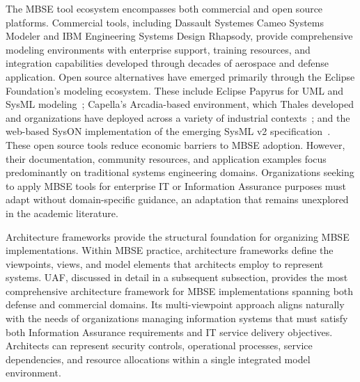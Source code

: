 The MBSE tool ecosystem encompasses both commercial and open source platforms. Commercial tools, including Dassault Systemes Cameo Systems Modeler and IBM Engineering Systems Design Rhapsody, provide comprehensive modeling environments with enterprise support, training resources, and integration capabilities developed through decades of aerospace and defense application. Open source alternatives have emerged primarily through the Eclipse Foundation's modeling ecosystem. These include Eclipse Papyrus for UML and SysML modeling~\parencite{Eclipse_Papyrus_2024}; Capella's Arcadia-based environment, which Thales developed and organizations have deployed across a variety of industrial contexts~\parencite{Capella_MBSE_2024, Roques_2016}; and the web-based SysON implementation of the emerging SysML v2 specification~\parencite{SysON_2025}.
These open source tools reduce economic barriers to MBSE adoption. However, their documentation, community resources, and application examples focus predominantly on traditional systems engineering domains. Organizations seeking to apply MBSE tools for enterprise IT or Information Assurance purposes must adapt without domain-specific guidance, an adaptation that remains unexplored in the academic literature.

Architecture frameworks provide the structural foundation for organizing MBSE implementations. Within MBSE practice, architecture frameworks define the viewpoints, views, and model elements that architects employ to represent systems. UAF, discussed in detail in a subsequent subsection, provides the most comprehensive architecture framework for MBSE implementations spanning both defense and commercial domains. Its multi-viewpoint approach aligns naturally with the needs of organizations managing information systems that must satisfy both Information Assurance requirements and IT service delivery objectives. Architects can represent security controls, operational processes, service dependencies, and resource allocations within a single integrated model environment.

